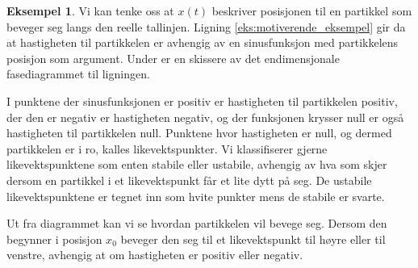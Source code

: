 \documentclass{article}
\theoremstyle{plain}
\theoremstyle{definition}
\newtheorem{eksempel}[teorem]{Eksempel}
\theoremstyle{remark}
\newcommand{\fcn}{x}
\begin{document}
\begin{eksempel}
    Vi kan tenke oss at $\fcn(t)$ beskriver posisjonen til en partikkel som beveger seg langs den reelle tallinjen. Ligning \eqref{eks:motiverende_eksempel} gir da at hastigheten til partikkelen er avhengig av en sinusfunksjon med partikkelens posisjon som argument. Under er en skissere av det endimensjonale fasediagrammet til ligningen.
    \begin{center}
    \end{center}
    I punktene der sinusfunksjonen er positiv er hastigheten til partikkelen positiv, der den er negativ er hastigheten negativ, og der funksjonen krysser null er også hastigheten til partikkelen null. Punktene hvor hastigheten er null, og dermed partikkelen er i ro, kalles likevektspunkter. Vi klassifiserer gjerne likevektspunktene som enten stabile eller ustabile, avhengig av hva som skjer dersom en partikkel i et likevektspunkt får et lite dytt på seg. De ustabile likevektspunktene er tegnet inn som hvite punkter mens de stabile er svarte.
    
    Ut fra diagrammet kan vi se hvordan partikkelen vil bevege seg. Dersom den begynner i posisjon $x_0$ beveger den seg til et likevektspunkt til høyre eller til venstre, avhengig at om hastigheten er positiv eller negativ.
\end{eksempel}
\end{document}
